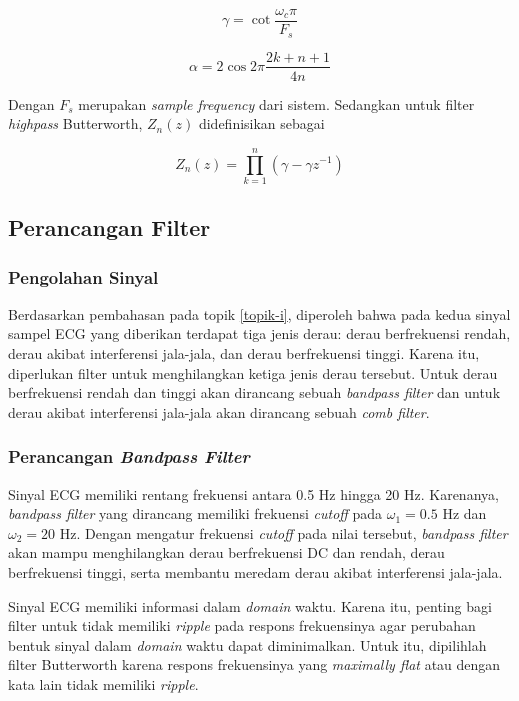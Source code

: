 \documentclass[11pt]{article}
\begin{document}
\begin{equation}
    \gamma = \cot{\frac{\omega_c \pi}{F_s}}
\end{equation}

\begin{equation}
    \alpha = 2 \cos{2 \pi \frac{2 k + n + 1}{4 n}}
\end{equation}

Dengan $F_s$ merupakan \textit{sample frequency} dari sistem. Sedangkan untuk filter \textit{highpass} Butterworth, $Z_n(z)$ didefinisikan sebagai

\begin{equation}
    Z_n(z) = \prod_{k = 1}^{n} (\gamma - \gamma z^{-1})
\end{equation}

\subsection{Perancangan Filter}

\subsubsection{Pengolahan Sinyal}

Berdasarkan pembahasan pada topik \ref{topik-i}, diperoleh bahwa pada kedua sinyal sampel ECG yang diberikan terdapat tiga jenis derau: derau berfrekuensi rendah, derau akibat interferensi jala-jala, dan derau berfrekuensi tinggi. Karena itu, diperlukan filter untuk menghilangkan ketiga jenis derau tersebut. Untuk derau berfrekuensi rendah dan tinggi akan dirancang sebuah \textit{bandpass filter} dan untuk derau akibat interferensi jala-jala akan dirancang sebuah \textit{comb filter}.

\subsubsection{Perancangan \textit{Bandpass Filter}}
Sinyal ECG memiliki rentang frekuensi antara 0.5 Hz hingga 20 Hz. Karenanya, \textit{bandpass filter} yang dirancang memiliki frekuensi \textit{cutoff} pada $\omega_1 = 0.5$ Hz dan $\omega_2 = 20$ Hz. Dengan mengatur frekuensi \textit{cutoff} pada nilai tersebut, \textit{bandpass filter} akan mampu menghilangkan derau berfrekuensi DC dan rendah, derau berfrekuensi tinggi, serta membantu meredam derau akibat interferensi jala-jala.

Sinyal ECG memiliki informasi dalam \textit{domain} waktu. Karena itu, penting bagi filter untuk tidak memiliki \textit{ripple} pada respons frekuensinya agar perubahan bentuk sinyal dalam \textit{domain} waktu dapat diminimalkan. Untuk itu, dipilihlah filter Butterworth karena respons frekuensinya yang \textit{maximally flat} atau dengan kata lain tidak memiliki \textit{ripple}.
\end{document}
